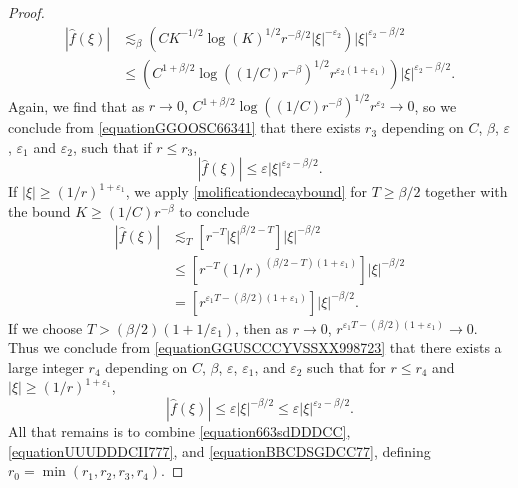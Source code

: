 \documentclass[12pt,reqno]{article}
\numberwithin{equation}{section}
\begin{document}
\begin{proof}
    \begin{equation} \label{equationGGOOSC66341}
    \begin{split}
        |\widehat{f}(\xi)| &\lesssim_\beta \left( C K^{-1/2} \log(K)^{1/2} r^{-\beta/2} |\xi|^{-\varepsilon_2} \right) |\xi|^{\varepsilon_2-\beta/2}\\
        &\leq \left( C^{1 + \beta/2} \log((1/C) r^{-\beta})^{1/2} r^{\varepsilon_2(1 + \varepsilon_1)} \right) |\xi|^{\varepsilon_2 - \beta/2}.
    \end{split}
    \end{equation}
    Again, we find that as $r \to 0$, $C^{1 + \beta/2} \log((1/C) r^{-\beta})^{1/2} r^{\varepsilon_2} \to 0$, so we conclude from \eqref{equationGGOOSC66341} that there exists $r_3$ depending on $C$, $\beta$, $\varepsilon$, $\varepsilon_1$ and $\varepsilon_2$, such that if $r \leq r_3$,
    \begin{equation} \label{equationUUUDDDCII777}
        |\widehat{f}(\xi)| \leq \varepsilon |\xi|^{\varepsilon_2-\beta/2}.
    \end{equation}
    If $|\xi| \geq (1/r)^{1 + \varepsilon_1}$, we apply \eqref{molificationdecaybound} for $T \geq \beta/2$ together with the bound $K \geq (1/C) r^{-\beta}$ to conclude
    \begin{equation} \label{equationGGUSCCCYVSSXX998723}
    \begin{split}
        |\widehat{f}(\xi)| &\lesssim_T [r^{-T} |\xi|^{\beta/2 - T}] |\xi|^{-\beta/2}\\
        &\leq \left[ r^{-T} (1/r)^{(\beta/2 - T)(1 + \varepsilon_1)} \right] |\xi|^{-\beta/2}\\
        &= \left[ r^{\varepsilon_1 T - (\beta/2)(1 + \varepsilon_1)} \right] |\xi|^{-\beta/2}.
    \end{split}
    \end{equation}
    If we choose $T > (\beta/2)(1 + 1/\varepsilon_1)$, then as $r \to 0$, $r^{\varepsilon_1 T - (\beta/2)(1 + \varepsilon_1)} \to 0$. Thus we conclude from \eqref{equationGGUSCCCYVSSXX998723} that there exists a large integer $r_4$ depending on $C$, $\beta$, $\varepsilon$, $\varepsilon_1$, and $\varepsilon_2$ such that for $r \leq r_4$ and $|\xi| \geq (1/r)^{1+\varepsilon_1}$,
    \begin{equation} \label{equationBBCDSGDCC77}
        |\widehat{f}(\xi)| \leq \varepsilon |\xi|^{-\beta/2} \leq \varepsilon |\xi|^{\varepsilon_2-\beta/2}.
    \end{equation}
    All that remains is to combine \eqref{equation663sdDDDCC}, \eqref{equationUUUDDDCII777}, and \eqref{equationBBCDSGDCC77}, defining $r_0 = \min(r_1,r_2,r_3,r_4)$.
\end{proof}
\end{document}
